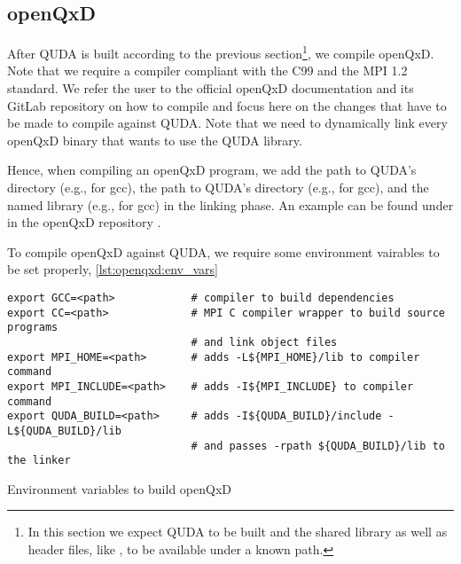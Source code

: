 \subsection{openQxD}

After QUDA is built according to the previous section\footnote{In this section we expect QUDA to be built and the shared library  as well as header files, like , to be available under a known path.}, we compile openQxD. Note that we require a compiler compliant with the C99 and the MPI 1.2 standard. We refer the user to the official openQxD documentation \cite{openqxd} and its GitLab repository \cite{gitlab:openqxd} on how to compile and focus here on the changes that have to be made to compile against QUDA. Note that we need to dynamically link every openQxD binary that wants to use the QUDA library.


Hence, when compiling an openQxD program, we add the path to QUDA's  directory (e.g.,  for gcc), the path to QUDA's  directory (e.g.,  for gcc), and the named library (e.g.,  for gcc) in the linking phase. An example  can be found under  in the openQxD repository \cite{gitlab:openqxd-devel}.

To compile openQxD against QUDA, we require some environment vairables to be set properly, \cref{lst:openqxd:env_vars}

\begin{codelisting}
\begin{verbatim}
export GCC=<path>            # compiler to build dependencies
export CC=<path>             # MPI C compiler wrapper to build source programs
                             # and link object files
export MPI_HOME=<path>       # adds -L${MPI_HOME}/lib to compiler command
export MPI_INCLUDE=<path>    # adds -I${MPI_INCLUDE} to compiler command
export QUDA_BUILD=<path>     # adds -I${QUDA_BUILD}/include -L${QUDA_BUILD}/lib
                             # and passes -rpath ${QUDA_BUILD}/lib to the linker
\end{verbatim}
\caption{Environment variables to build openQxD}
\label{lst:openqxd:env_vars}
\end{codelisting}

